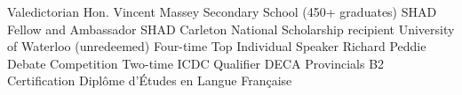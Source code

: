 \begin{cvhonors}
  \cvhonor
    {Valedictorian}
    {Hon. Vincent Massey Secondary School (450+ graduates)}
    {}
    {}
  \cvhonor
    {SHAD Fellow and Ambassador}
    {SHAD Carleton}
    {}
    {}
  \cvhonor
    {National Scholarship recipient}
    {University of Waterloo (unredeemed)}
    {}
    {}
  \cvhonor
    {Four-time Top Individual Speaker}
    {Richard Peddie Debate Competition}
    {}
    {}
  \cvhonor
    {Two-time ICDC Qualifier}
    {DECA Provincials}
    {}
    {}
   \cvhonor
     {B2 Certification}
     {Diplôme d'Études en Langue Française}
     {}
     {}
\end{cvhonors}
